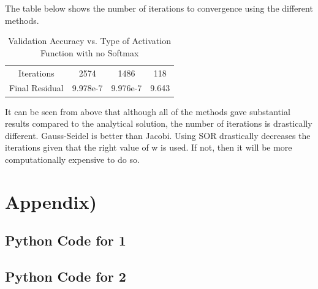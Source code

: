 \documentclass{article}
\begin{document}
		
		The table below shows the number of iterations to convergence using the different methods.
		\begin{table}[h!]
			\centering
			\small
			\begin{tabular}{| *{4}{c|}}
				\hline
				\thead{} & \thead{Jacobi} & \thead{Gauss-Seidel} & \thead{SOR}\\
				\hline
				Iterations & 2574 & 1486 & 118 \\
				\hline
				Final Residual & 9.978e-7 & 9.976e-7 & 9.643 \\
				\hline
			\end{tabular}
			\caption{Validation Accuracy vs. Type of Activation Function with no Softmax}
		\end{table}	
		
		
		It can be seen from above that although all of the methods gave substantial results compared to the analytical solution, the number of iterations is drastically different. Gauss-Seidel is better than Jacobi. Using SOR drastically decreases the iterations given that the right value of w is used. If not, then it will be more computationally expensive to do so. 
		
		\section*{Appendix)}
			\subsection*{ Python Code for 1 }
			
			\subsection*{ Python Code for 2 }
			
	
	
\end{document}
